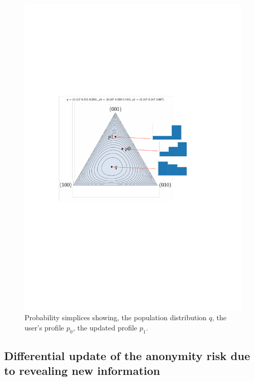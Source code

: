 \begin{figure}[htb]
\includegraphics[scale=\textwidth]{figures/triplex_profiles.pdf}
\caption[Probability simplices]{Probability simplices showing, the population distribution $q$, the user's profile $p_0$, the updated profile $p_1$.}
\label{fig:2-1}
\end{figure}

\subsection{Differential update of the anonymity risk due to revealing new information}
\label{sec:1.4}

